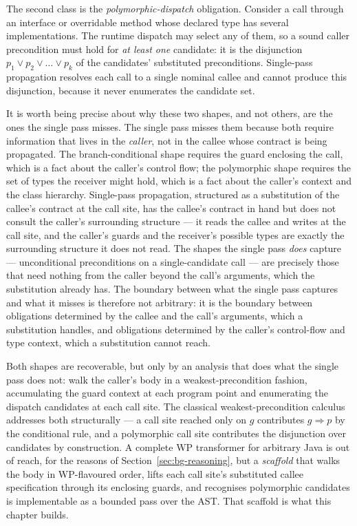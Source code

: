 The second class is the \emph{polymorphic-dispatch} obligation. Consider a call
through an interface or overridable method whose declared type has several
implementations. The runtime dispatch may select any of them, so a sound caller
precondition must hold for \emph{at least one} candidate: it is the disjunction
$p_1 \vee p_2 \vee \dots \vee p_k$ of the candidates' substituted preconditions.
Single-pass propagation resolves each call to a single nominal callee and cannot
produce this disjunction, because it never enumerates the candidate set.

It is worth being precise about why these two shapes, and not others, are the ones
the single pass misses. The single pass misses them because both require
information that lives in the \emph{caller}, not in the callee whose contract is
being propagated. The branch-conditional shape requires the guard enclosing the
call, which is a fact about the caller's control flow; the polymorphic shape
requires the set of types the receiver might hold, which is a fact about the
caller's context and the class hierarchy. Single-pass propagation, structured as a
substitution of the callee's contract at the call site, has the callee's contract
in hand but does not consult the caller's surrounding structure --- it reads the
callee and writes at the call site, and the caller's guards and the receiver's
possible types are exactly the surrounding structure it does not read. The shapes
the single pass \emph{does} capture --- unconditional preconditions on a
single-candidate call --- are precisely those that need nothing from the caller
beyond the call's arguments, which the substitution already has. The boundary
between what the single pass captures and what it misses is therefore not arbitrary:
it is the boundary between obligations determined by the callee and the call's
arguments, which a substitution handles, and obligations determined by the caller's
control-flow and type context, which a substitution cannot reach.

Both shapes are recoverable, but only by an analysis that does what the single
pass does not: walk the caller's body in a weakest-precondition fashion,
accumulating the guard context at each program point and enumerating the
dispatch candidates at each call site. The classical weakest-precondition
calculus~\cite{dijkstra_guarded_1975} addresses both structurally --- a call
site reached only on $g$ contributes $g \Rightarrow p$ by the conditional rule,
and a polymorphic call site contributes the disjunction over candidates by
construction. A complete WP transformer for arbitrary Java is out of reach, for
the reasons of Section~\ref{sec:bg-reasoning}, but a \emph{scaffold} that walks
the body in WP-flavoured order, lifts each call site's substituted callee
specification through its enclosing guards, and recognises polymorphic
candidates is implementable as a bounded pass over the AST. That scaffold is
what this chapter builds.

